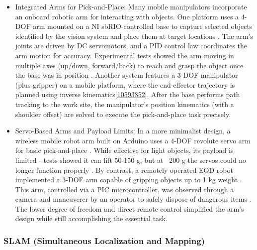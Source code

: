 \documentclass{article}
\begin{document}
\begin{itemize}
  
  \item Integrated Arms for Pick-and-Place: Many mobile manipulators incorporate an onboard robotic arm for interacting with objects. One platform uses a 4-DOF arm mounted on a NI sbRIO-controlled base to capture selected objects identified by the vision system and place them at target locations \cite{7475009}. The arm's joints are driven by DC servomotors, and a PID control law coordinates the arm motion for accuracy. Experimental tests showed the arm moving in multiple axes (up/down, forward/back) to reach and grasp the object once the base was in position \cite{7475009}. Another system features a 3-DOF manipulator (plus gripper) on a mobile platform, where the end-effector trajectory is planned using inverse kinematics\ref{10593852}. After the base performs path tracking to the work site, the manipulator's position kinematics (with a shoulder offset) are solved to execute the pick-and-place task precisely.
  \item Servo-Based Arms and Payload Limits: In a more minimalist design, a wireless mobile robot arm built on Arduino uses a 4-DOF revolute servo arm for basic pick-and-place \cite{YUSOFF20121072}. While effective for light objects, its payload is limited - tests showed it can lift 50-150 g, but at ~200 g the servos could no longer function properly \cite{YUSOFF20121072}. By contrast, a remotely operated EOD robot implemented a 3-DOF arm capable of gripping objects up to 1 kg weight \cite{6805994}. This arm, controlled via a PIC microcontroller, was observed through a camera and maneuverer by an operator to safely dispose of dangerous items \cite{6805994}. The lower degree of freedom and direct remote control simplified the arm's design while still accomplishing the essential task.

\end{itemize}

\subsubsection{SLAM (Simultaneous Localization and Mapping)}
\end{document}
